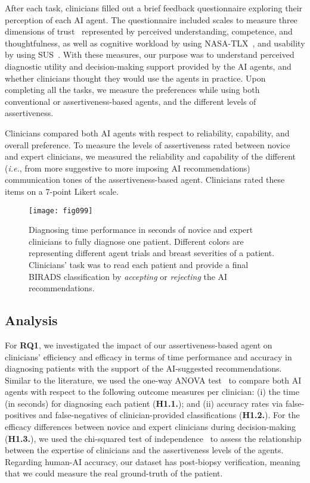 After each task, clinicians filled out a brief feedback questionnaire exploring their perception of each AI agent.
The questionnaire included scales to measure three dimensions of trust~\cite{Loper2020} represented by perceived understanding, competence, and thoughtfulness, as well as cognitive workload by using NASA-TLX~\cite{info:doi/10.2196/19472}, and usability by using SUS~\cite{doi:10.1080/10447318.2018.1455307}.
With these measures, our purpose was to understand perceived diagnostic utility and decision-making support provided by the AI agents, and whether clinicians thought they would use the agents in practice.
Upon completing all the tasks, we measure the preferences while using both conventional or assertiveness-based agents, and the different levels of assertiveness.

Clinicians compared both AI agents with respect to reliability, capability, and overall preference.
To measure the levels of assertiveness rated between novice and expert clinicians, we measured the reliability and capability of the different ({\it i.e.}, from more suggestive to more imposing AI recommendations) communication tones of the assertiveness-based agent.
Clinicians rated these items on a 7-point Likert scale.

\begin{figure*}[htpb]
\centering
\texttt{[image: fig099]}
\caption[]{Diagnosing time performance in seconds of novice and expert clinicians to fully diagnose one patient. Different colors are representing different agent trials and breast severities of a patient. Clinicians' task was to read each patient and provide a final BIRADS classification by {\it accepting} or {\it rejecting} the AI recommendations.}
\label{fig:fig099}
\end{figure*}

\subsection{Analysis}
\label{sec:chap006005005}

For {\bf RQ1}, we investigated the impact of our assertiveness-based agent on clinicians' efficiency and efficacy in terms of time performance and accuracy in diagnosing patients with the support of the AI-suggested recommendations.
Similar to the literature, we used the one-way ANOVA test~\cite{SADEGHI2022105554, 10.1145/3491102.3517791} to compare both AI agents with respect to the following outcome measures per clinician:
(i) the time (in seconds) for diagnosing each patient ({\bf H1.1.}); and
(ii) accuracy rates via false-positives and false-negatives of clinician-provided classifications ({\bf H1.2.}).
For the efficacy differences between novice and expert clinicians during decision-making ({\bf H1.3.}), we used the chi-squared test of independence~\cite{10.1145/3411764.3445464} to assess the relationship between the expertise of clinicians and the assertiveness levels of the agents.
Regarding human-AI accuracy, our dataset has post-biopsy verification, meaning that we could measure the real ground-truth of the patient.

